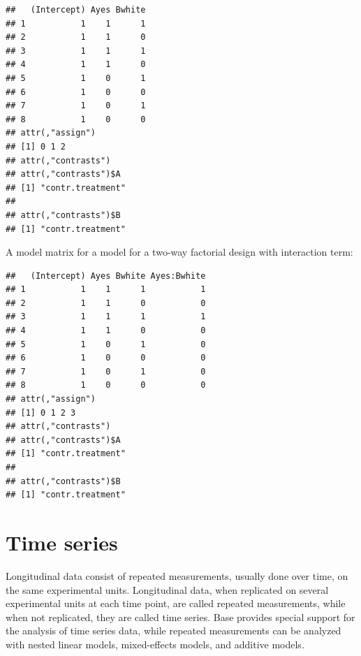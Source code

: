 \documentclass[krantz2]{krantz}\usepackage{knitr}
\begin{document}
\begin{explainbox}
\begin{knitrout}\footnotesize
{}\color{fgcolor}\begin{kframe}
\begin{alltt}
\hlstd{(}\hlopt{~}  \hlopt{+} 
\end{alltt}
\begin{verbatim}
##   (Intercept) Ayes Bwhite
## 1           1    1      1
## 2           1    1      0
## 3           1    1      1
## 4           1    1      0
## 5           1    0      1
## 6           1    0      0
## 7           1    0      1
## 8           1    0      0
## attr(,"assign")
## [1] 0 1 2
## attr(,"contrasts")
## attr(,"contrasts")$A
## [1] "contr.treatment"
##
## attr(,"contrasts")$B
## [1] "contr.treatment"
\end{verbatim}
\end{kframe}
\end{knitrout}

A model matrix for a model for a two-way factorial design with interaction term:

\begin{knitrout}\footnotesize
{}\color{fgcolor}\begin{kframe}
\begin{alltt}
\hlstd{(}\hlopt{~}  \hlopt{*} 
\end{alltt}
\begin{verbatim}
##   (Intercept) Ayes Bwhite Ayes:Bwhite
## 1           1    1      1           1
## 2           1    1      0           0
## 3           1    1      1           1
## 4           1    1      0           0
## 5           1    0      1           0
## 6           1    0      0           0
## 7           1    0      1           0
## 8           1    0      0           0
## attr(,"assign")
## [1] 0 1 2 3
## attr(,"contrasts")
## attr(,"contrasts")$A
## [1] "contr.treatment"
##
## attr(,"contrasts")$B
## [1] "contr.treatment"
\end{verbatim}
\end{kframe}
\end{knitrout}

\end{explainbox}

\section{Time series}\label{sec:stat:time:series}
Longitudinal data consist of repeated measurements, usually done over time, on the same experimental units. Longitudinal data, when replicated on several experimental units at each time point, are called repeated measurements, while when not replicated, they are called time series. Base \Rlang provides special support for the analysis of time series data, while repeated measurements can be analyzed with nested linear models, mixed-effects models, and additive models.
\end{document}
